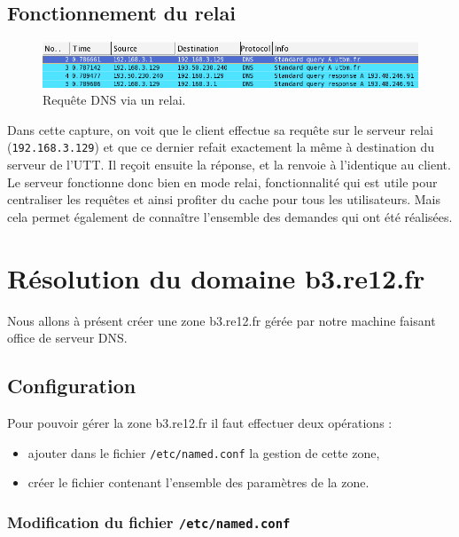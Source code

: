\documentclass[12pt,a4paper,notitlepage]{article}
\begin{document}
\subsection{Fonctionnement du relai}

\begin{figure}[!h]
\begin{center}
\includegraphics[scale=0.61]{capture-via-relai}
\caption{Requête DNS via un relai.}
\label{fig:da}
\end{center}
\end{figure}

Dans cette capture, on voit que le client effectue sa requête sur le serveur relai (\texttt{192.168.3.129}) et que ce dernier refait exactement la même à destination du serveur de l'UTT. Il reçoit ensuite la réponse, et la renvoie à l'identique au client. Le serveur fonctionne donc bien en mode relai, fonctionnalité qui est utile pour centraliser les requêtes et ainsi profiter du cache pour tous les utilisateurs. Mais cela permet également de connaître l'ensemble des demandes qui ont été réalisées.



\section{Résolution du domaine b3.re12.fr}

Nous allons à présent créer une zone b3.re12.fr gérée par notre machine faisant office de serveur DNS.

\subsection{Configuration}

Pour pouvoir gérer la zone b3.re12.fr il faut effectuer deux opérations :
\begin{itemize}
\item ajouter dans le fichier \texttt{/etc/named.conf} la gestion de cette zone,
\item créer le fichier contenant l'ensemble des paramètres de la zone.
\end{itemize}

\bigskip

\subsubsection{Modification du fichier \texttt{/etc/named.conf}}
\end{document}
